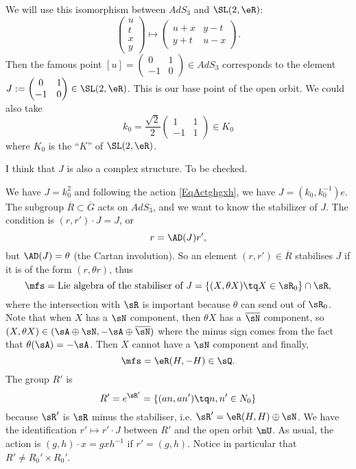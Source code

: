 We will use this isomorphism between $AdS_3$ and $\SL(2,\eR)$:
\[
	\begin{pmatrix}
		u \\t\\x\\y
	\end{pmatrix}\mapsto
	\begin{pmatrix}
		u+x & y-t \\y+t&u-x
	\end{pmatrix}.
\]
Then the famous point $[u]=\begin{pmatrix}
		0 & 1 \\-1&0
	\end{pmatrix}\in AdS_3$ corresponds to the element $J:=\begin{pmatrix}
		0 & 1 \\-1&0
	\end{pmatrix}\in \SL(2,\eR)$. This is our base point of the open orbit. We could also take
\[
	k_{0}=\frac{ \sqrt 2 }{ 2 }\begin{pmatrix}
		1 & 1 \\-1&1
	\end{pmatrix}\in K_{0}
\]
where $K_{0}$ is the ``$K$'' of $\SL(2,\eR)$.
\begin{probleme}
	I think that $J$ is also a complex structure. To be checked.
\end{probleme}
We have $J=k_{0}^{2}$ and following the action \eqref{EqActghgxh}, we have $J=(k_{0},k_{0}^{-1})e$. The subgroup $\overline{R}\subset\overline{G}$ acts on $AdS_3$, and we want to know the stabilizer of $J$. The condition is $(r,r')\cdot J=J$, or
\[
	r=\AD(J)r',
\]
but $\AD(J)=\theta$ (the Cartan involution). So an element $(r,r')\in\overline{R}$ stabilises $J$ if it is of the form $(r,\theta r)$, thus
\[
	\mfs=\text{Lie algebra of the stabiliser of }J=\{ (X,\theta X)\tq X\in\sR_{0} \}\cap\sR,
\]
where the intersection with $\sR$ is important because $\theta$ can send out of $\sR_{0}$. Note that when $X$ has a $\sN$ component, then $\theta X$ has a $\overline{ \sN }$ component, so $(X,\theta X)\in(\sA\oplus\sN,-\sA\oplus\overline{ \sN })$ where the minus sign comes from the fact that $\theta(\sA)=-\sA$. Then $X$ cannot have a $\sN$ component and finally,
\[
	\mfs=\eR (H,-H)\in\sQ.
\]
The group $R'$ is
\begin{equation}
	R'= e^{\sR'}=\{ (an,an')\tq n,n'\in N_{0} \}
\end{equation}
because $\sR'$ is $\sR$ minus the stabiliser, i.e. $\sR'=\eR(H,H)\oplus\sN$. We have the identification $r'\mapsto r'\cdot J$ between $R'$ and the open orbit $\mU$. As usual, the action is $(g,h)\cdot x=gxh^{-1}$ if $r'=(g,h)$. Notice in particular that $R'\neq R_{0}'\times R_{0}'$.

